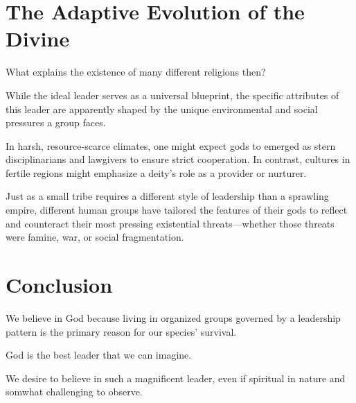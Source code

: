 \section{The Adaptive Evolution of the Divine}

What explains the existence of many different religions then? 

While the ideal leader serves as a universal blueprint, the specific attributes of this leader are apparently shaped by the unique environmental and social pressures a group faces.

In harsh, resource-scarce climates, one might expect gods to emerged as stern disciplinarians and lawgivers to ensure strict cooperation.
In contrast, cultures in fertile regions might emphasize a deity’s role as a provider or nurturer.

Just as a small tribe requires a different style of leadership than a sprawling empire, different human groups have tailored the features of their gods to reflect and counteract their most pressing existential threats—whether those threats were famine, war, or social fragmentation. 


\section{Conclusion}

We believe in God because living in organized groups governed by a leadership pattern is the primary reason for our species' survival.

God is the best leader that we can imagine.

We desire to believe in such a magnificent leader, even if spiritual in nature and somwhat challenging to observe.
